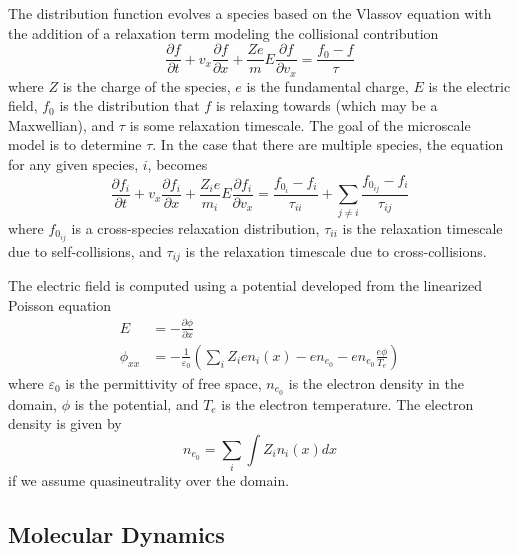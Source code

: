 \documentclass[11pt]{article}
\begin{document}
The distribution function evolves a species based on the Vlassov equation with the addition of a relaxation term modeling the collisional contribution
\begin{equation*}
\frac{\partial f}{\partial t} + v_x\frac{\partial f}{\partial x} 
+ \frac{Ze}{m}E\frac{\partial f}{\partial v_x} = \frac{f_0 - f}{\tau}
\end{equation*}
where $Z$ is the charge of the species, $e$ is the fundamental charge, $E$ is the electric field, $f_0$ is the distribution that $f$ is relaxing towards (which may be a Maxwellian), and $\tau$ is some relaxation timescale. The goal of the microscale model is to determine $\tau$. In the case that there are multiple species, the equation for any given species, $i$, becomes
\begin{equation*}
\frac{\partial f_i}{\partial t} + v_x\frac{\partial f_i}{\partial x} 
+ \frac{Z_ie}{m_i}E\frac{\partial f_i}{\partial v_x} = 
\frac{f_{0_i} - f_i}{\tau_{ii}} + \sum_{j \neq i}\frac{f_{0_{ij}} - f_i}{\tau_{ij}}
\end{equation*}
where $f_{0_{ij}}$ is a cross-species relaxation distribution, $\tau_{ii}$ is the relaxation timescale due to self-collisions, and $\tau_{ij}$ is the relaxation timescale due to cross-collisions.

The electric field is computed using a potential developed from the linearized Poisson equation
\begin{align*}
E &= -\frac{\partial\phi}{\partial x} \\
\phi_{xx} &= -\frac{1}{\varepsilon_0}\left(\sum_{i}Z_ien_i(x)-en_{e_0}-en_{e_0}\frac{e\phi} {T_e}\right)
\end{align*}
where $\varepsilon_0$ is the permittivity of free space, $n_{e_0}$ is the electron density in the domain, $\phi$ is the potential, and $T_e$ is the electron temperature. The electron density is given by
\begin{equation*}
n_{e_0} = \sum_{i}\int Z_in_i(x)dx
\end{equation*}
if we assume quasineutrality over the domain.

\subsection*{Molecular Dynamics}
\end{document}
